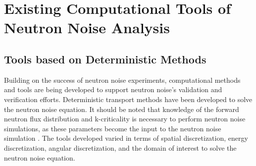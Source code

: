 \section{Existing Computational Tools of Neutron Noise Analysis}

\subsection{Tools based on Deterministic Methods}

Building on the success of neutron noise experiments, computational methods and tools are being developed to support neutron noise's validation and verification efforts. Deterministic transport methods have been developed to solve the neutron noise equation. It should be noted that knowledge of the forward neutron flux distribution and k-criticality is necessary to perform neutron noise simulations, as these parameters become the input to the neutron noise simulation \cite{demaziereDevelopment2D2group2004}. The tools developed varied in terms of spatial discretization, energy discretization, angular discretization, and the domain of interest to solve the neutron noise equation. 

